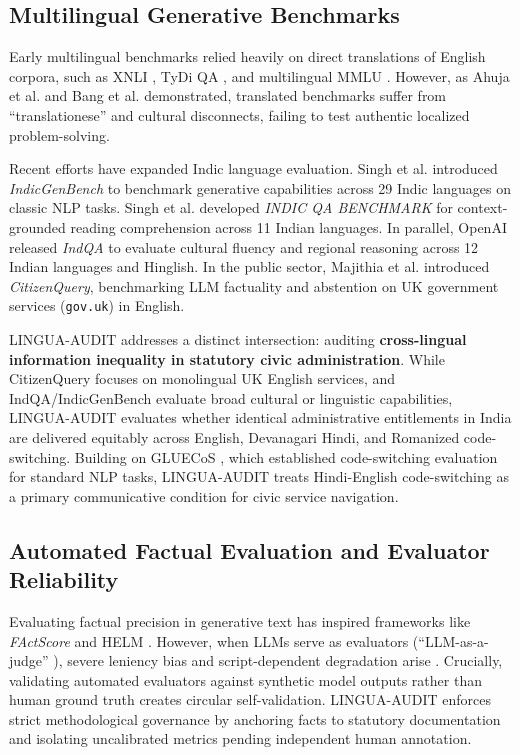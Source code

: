 \documentclass[11pt,a4paper]{article}
\begin{document}
\subsection{Multilingual Generative Benchmarks}
\label{sec:related_benchmarks}

Early multilingual benchmarks relied heavily on direct translations of English corpora, such as XNLI \cite{conneau2018xnli}, TyDi QA \cite{clark2020tydi}, and multilingual MMLU \cite{hendrycks2021measuring}. However, as Ahuja et al. \cite{ahuja2023mega} and Bang et al. \cite{bang2023multitask} demonstrated, translated benchmarks suffer from ``translationese'' and cultural disconnects, failing to test authentic localized problem-solving.

Recent efforts have expanded Indic language evaluation. Singh et al. \cite{singh2024indicgenbench} introduced \emph{IndicGenBench} to benchmark generative capabilities across 29 Indic languages on classic NLP tasks. Singh et al. \cite{singh2024indicqa} developed \emph{INDIC QA BENCHMARK} for context-grounded reading comprehension across 11 Indian languages. In parallel, OpenAI \cite{openai2025indqa} released \emph{IndQA} to evaluate cultural fluency and regional reasoning across 12 Indian languages and Hinglish. In the public sector, Majithia et al. \cite{majithia2026citizenquery} introduced \emph{CitizenQuery}, benchmarking LLM factuality and abstention on UK government services (\texttt{gov.uk}) in English.

LINGUA-AUDIT addresses a distinct intersection: auditing \textbf{cross-lingual information inequality in statutory civic administration}. While CitizenQuery focuses on monolingual UK English services, and IndQA/IndicGenBench evaluate broad cultural or linguistic capabilities, LINGUA-AUDIT evaluates whether identical administrative entitlements in India are delivered equitably across English, Devanagari Hindi, and Romanized code-switching. Building on GLUECoS \cite{khanuja2020gluecos}, which established code-switching evaluation for standard NLP tasks, LINGUA-AUDIT treats Hindi-English code-switching as a primary communicative condition for civic service navigation.

\subsection{Automated Factual Evaluation and Evaluator Reliability}
\label{sec:related_evaluation}

Evaluating factual precision in generative text has inspired frameworks like \emph{FActScore} \cite{min2023factscore} and HELM \cite{liang2023holistic}. However, when LLMs serve as evaluators (``LLM-as-a-judge'' \cite{zheng2023judging}), severe leniency bias and script-dependent degradation arise \cite{hada2023large}. Crucially, validating automated evaluators against synthetic model outputs rather than human ground truth creates circular self-validation. LINGUA-AUDIT enforces strict methodological governance by anchoring facts to statutory documentation and isolating uncalibrated metrics pending independent human annotation.
\end{document}
